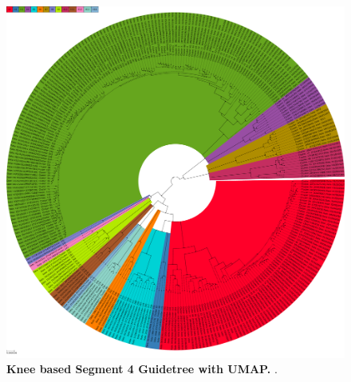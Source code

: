 \begin{figure}[!hbt]
    \includegraphics[width=\dimexpr\textwidth-2\fboxsep-2\fboxrule,fbox]{UMAP/Guidetree_segment_4_H_Centroid.pdf}
    \caption[Knee based Segment 4 Guidetree with \Acrshort{UMAP}]{\textbf{Knee based Segment 4 Guidetree with \Acrshort{UMAP}.} .}
    \label{fig:UMAP_Guidetree_Centroid_4}
\end{figure}

